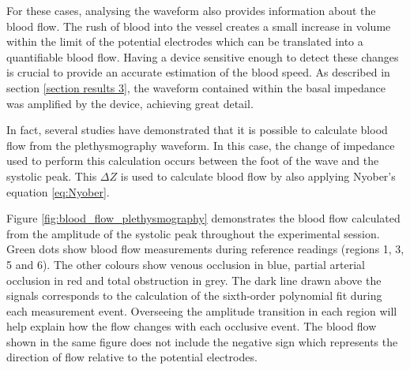 For these cases, analysing the waveform also provides information about the blood flow.  The rush of blood into the vessel creates a small increase in volume within the limit of the potential electrodes which can be translated into a quantifiable blood flow. Having a device sensitive enough to detect these changes is crucial to provide an accurate estimation of the blood speed. As described in section \ref{section results 3}, the waveform contained within the basal impedance was amplified by the device, achieving great detail. 

In fact, several studies  have demonstrated that it is possible to calculate blood flow from the plethysmography waveform. In this case, the change of impedance used to perform this calculation occurs between the foot of the wave and the systolic peak. This $\Delta Z$ is used to calculate blood flow by also applying Nyober's equation \ref{eq:Nyober}. 

Figure \ref{fig:blood_flow_plethysmography} demonstrates the blood flow calculated from the amplitude of the systolic peak throughout the experimental session. Green dots show blood flow measurements during reference readings (regions 1, 3, 5 and 6). The other colours show venous occlusion in blue, partial arterial occlusion in red and total obstruction in grey. The dark line drawn above the signals corresponds to the calculation of the sixth-order polynomial fit during each measurement event. Overseeing the amplitude transition in each region will help explain how the flow changes with each occlusive event. The blood flow shown in the same figure does not include the negative sign which represents the direction of flow relative to the potential electrodes.


